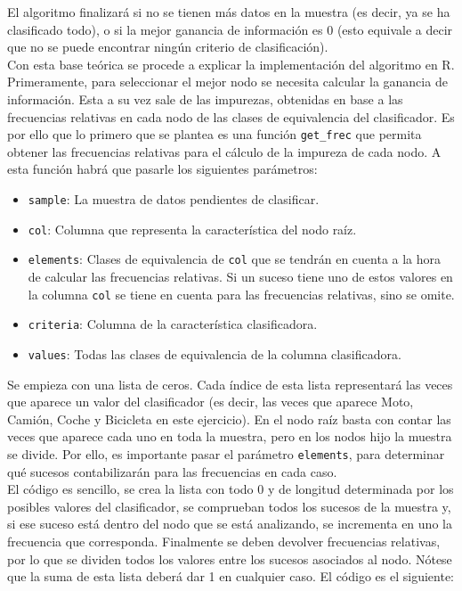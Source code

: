 \documentclass[12pt]{report}\usepackage[]{graphicx}\usepackage[dvipsnames]{xcolor}
\begin{document}
	 			El algoritmo finalizará si no se tienen más datos en la muestra (es decir, ya se ha clasificado todo), o si la mejor ganancia de información es 0 (esto equivale a decir que no se puede encontrar ningún criterio de clasificación).\\
	 			
	 			Con esta base teórica se procede a explicar la implementación del algoritmo en R. Primeramente, para seleccionar el mejor nodo se necesita calcular la ganancia de información. Esta a su vez sale de las impurezas, obtenidas en base a las frecuencias relativas en cada nodo de las clases de equivalencia del clasificador. Es por ello que lo primero que se plantea es una función \texttt{get\_frec} que permita obtener las frecuencias relativas para el cálculo de la impureza de cada nodo. A esta función habrá que pasarle los siguientes parámetros:
	 			
	 			\begin{itemize}
	 				\item \texttt{sample}: La muestra de datos pendientes de clasificar.
	 				\item \texttt{col}: Columna que representa la característica del nodo raíz.
	 				\item \texttt{elements}: Clases de equivalencia de \texttt{col} que se tendrán en cuenta a la hora de calcular las frecuencias relativas. Si un suceso tiene uno de estos valores en la columna \texttt{col} se tiene en cuenta para las frecuencias relativas, sino se omite. 
	 				\item \texttt{criteria}: Columna de la característica clasificadora.
	 				\item \texttt{values}: Todas las clases de equivalencia de la columna clasificadora.
	 			\end{itemize}
	 			
	 			Se empieza con una lista de ceros. Cada índice de esta lista representará las veces que aparece un valor del clasificador (es decir, las veces que aparece Moto, Camión, Coche y Bicicleta en este ejercicio). En el nodo raíz basta con contar las veces que aparece cada uno en toda la muestra, pero en los nodos hijo la muestra se divide. Por ello, es importante pasar el parámetro \texttt{elements}, para determinar qué sucesos contabilizarán para las frecuencias en cada caso.\\
	 			
	 			El código es sencillo, se crea la lista con todo 0 y de longitud determinada por los posibles valores del clasificador, se comprueban todos los sucesos de la muestra y, si ese suceso está dentro del nodo que se está analizando, se incrementa en uno la frecuencia que corresponda. Finalmente se deben devolver frecuencias relativas, por lo que se dividen todos los valores entre los sucesos asociados al nodo. Nótese que la suma de esta lista deberá dar 1 en cualquier caso. El código es el siguiente:
	 			
\end{document}
